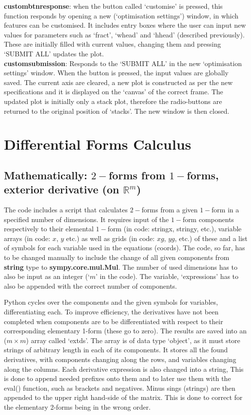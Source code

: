 \documentclass[12pt]{report}
\begin{document}
\textbf{custom\textunderscore btn\textunderscore response}: when the button called `customise' is pressed, this function responds by opening a new (`optimisation settings') window, in which features can be customised. It includes entry boxes where the user can input new values for parameters such as `fract', `w\textunderscore head' and `h\textunderscore head' (described previously). These are initially filled with current values, changing them and pressing `SUBMIT ALL' updates the plot.\\
\textbf{custom\textunderscore submission}: Responds to the `SUBMIT ALL' in the new `optimisation settings' window. When the button is pressed, the input values are globally saved. The current axis are cleared, a new plot is constructed as per the new specifications and it is displayed on the `canvas' of the correct frame. The updated plot is initially only a stack plot, therefore the radio-buttons are returned to the original position of `stacks'. The new window is then closed.

\chapter{Differential Forms Calculus}

\section{Mathematically: $2-$forms from $1-$forms, exterior derivative (on $\mathbb{R}^{m}$)}
The code includes a script that calculates $2-$forms from a given $1-$form in a specified number of dimensions.
It requires input of the $1-$form components respectively to their elemental $1-$form (in code: string\textunderscore x, string\textunderscore y, etc.), variable arrays (in code: $x$, $y$ etc.) as well as grids (in code: $xg$, $yg$, etc.) of these and a list of symbols for each variable used in the equations (coords).
The code, so far, has to be changed manually to include the change of all given components from \textbf{string} type to \textbf{sympy.core.mul.Mul}. The number of used dimensions has to also be input as an integer (`$m$' in the code). The variable, `expressions' has to also be appended with the correct number of components.

\noindent Python cycles over the components and the given symbols for variables, differentiating each. To improve efficiency, the derivatives have not been completed when components are to be differentiated with respect to their corresponding elementary 1-form (these go to zero). The results are saved into an ($m \times m$) array called `ext\textunderscore ds'. The array is of data type `object', as it must store strings of arbitrary length in each of its components. It stores all the found derivatives, with components changing along the rows, and variables changing along the columns.
Each derivative expression is also changed into a string, This is done to append needed prefixes onto them and to later use them with the eval() function, such as brackets and negatives. Minus sings (strings) are then appended to the upper right hand-side of the matrix. This is done to correct for the elementary 2-forms being in the wrong order.
\end{document}
